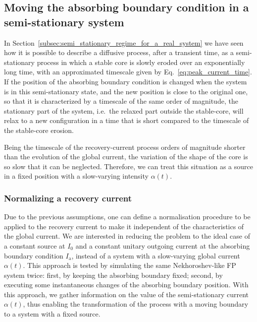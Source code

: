 {%

\subsection{Moving the absorbing boundary condition in a semi-stationary system}
\label{subsec:Moving_the_boundary_in_a_semi_stationary_system}


In Section~\ref{subsec:semi_stationary_regime_for_a_real_system} we have seen how it is possible to describe a diffusive process, after a transient time, as a semi-stationary process in which a stable core is slowly eroded over an exponentially long time, with an approximated timescale given by Eq.~\eqref{eq:peak_current_time}. If the position of the absorbing boundary condition is changed when the system is in this semi-stationary state, and the new position is close to the original one, so that it is characterized by a timescale of the same order of magnitude, the stationary part of the system, i.e.\ the relaxed part outside the stable-core, will relax to a new configuration in a time that is short compared to the timescale of the stable-core erosion.

Being the timescale of the recovery-current process orders of magnitude shorter than the evolution of the global current, the variation of the shape of the core is so slow that it can be neglected. Therefore, we can treat this situation as a source in a fixed position with a slow-varying intensity $\alpha(t)$. 


\subsubsection{Normalizing a recovery current}


Due to the previous assumptions, one can define a normalisation procedure to be applied to the recovery current to make it independent of the characteristics of the global current. We are interested in reducing the problem to the ideal case of a constant source at $I_0$ and a constant unitary outgoing current at the absorbing boundary condition $I_\mathrm{a}$, instead of a system with a slow-varying global current $\alpha(t)$. This approach is tested by simulating the same Nekhoroshev-like FP system twice: first, by keeping the absorbing boundary fixed; second, by executing some instantaneous changes of the absorbing boundary position. With this approach, we gather information on the value of the semi-stationary current $\alpha(t)$, thus enabling the transformation of the process with a moving boundary to a system with a fixed source.

}
